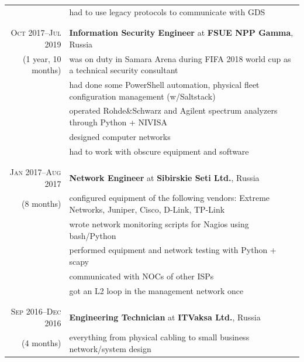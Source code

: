 \documentclass[a4paper,11pt]{article}
\begin{document}
\begin{longtable}{r|p{}}
                         & had to use legacy protocols to communicate with GDS                                        \\
      \\&\\
      \textsc{Oct 2017--Jul 2019} & \large \sffamily \textbf{Information Security Engineer} at \textbf{FSUE NPP Gamma},
                                    Russia                                                                               \\
      \nopagebreak
      (1 year, 10 months) & was on duty in Samara Arena during FIFA 2018 world cup as a technical security
                            consultant                                                                                   \\
                          & had done some PowerShell automation, physical fleet configuration management (w/Saltstack)   \\
                          & operated Rohde\&Schwarz and Agilent spectrum analyzers through Python + NIVISA               \\
                          & designed computer networks                                                                   \\
                          & had to work with obscure equipment and software                                              \\
      \\&\\
      \textsc{Jan 2017--Aug 2017} & \large \sffamily \textbf{Network Engineer} at \textbf{Sibirskie Seti Ltd.}, Russia   \\
      \nopagebreak
      (8 months) & configured equipment of the following vendors: Extreme Networks, Juniper, Cisco, D-Link, TP-Link      \\
                 & wrote network monitoring scripts for Nagios using bash/Python                                         \\
                 & performed equipment and network testing with Python + scapy                                           \\
                 & communicated with NOCs of other ISPs                                                                  \\
                 & got an L2 loop in the management network once                                                         \\
      \\&\\
      \textsc{Sep 2016--Dec 2016} & \large \sffamily \textbf{Engineering Technician} at \textbf{ITVaksa Ltd.}, Russia    \\
      \nopagebreak
      (4 months) & everything from physical cabling to small business network/system design                              \\
    \end{longtable}
\end{document}

